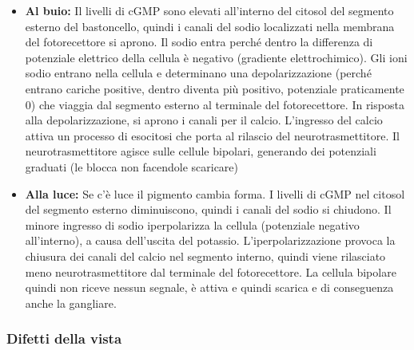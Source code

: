 \documentclass[a4paper]{article}
\begin{document}
\begin{itemize}
    \item \textbf{Al buio:}
        Il livelli di cGMP sono elevati all'interno del citosol del segmento esterno
        del bastoncello, quindi i canali del sodio localizzati nella membrana del fotorecettore
        si aprono. Il sodio entra perché dentro la differenza di potenziale
        elettrico della cellula è negativo (gradiente elettrochimico).
        Gli ioni sodio entrano nella cellula e determinano una depolarizzazione
        (perché entrano cariche positive, dentro diventa più positivo, potenziale praticamente 0) che viaggia
        dal segmento esterno al terminale del fotorecettore. 
        In risposta alla depolarizzazione, si aprono i canali per il calcio.
        L'ingresso del calcio attiva un processo di esocitosi che porta al rilascio del neurotrasmettitore.
        Il neurotrasmettitore agisce sulle cellule bipolari, generando dei potenziali graduati (le blocca non facendole scaricare)
    \item \textbf{Alla luce:}
        Se c'è luce il pigmento cambia forma. I livelli di cGMP nel citosol del segmento esterno diminuiscono, quindi i canali del sodio si chiudono.
        Il minore ingresso di sodio iperpolarizza la cellula (potenziale negativo all'interno),
        a causa dell'uscita del potassio.
        L'iperpolarizzazione provoca la chiusura dei canali del calcio nel segmento interno,
        quindi viene rilasciato meno neurotrasmettitore dal terminale del fotorecettore.
        La cellula bipolare quindi non riceve nessun segnale, è attiva e quindi scarica
        e di conseguenza anche la gangliare.
\end{itemize}

\pagebreak

\subsubsection{Difetti della vista}



\end{document}
